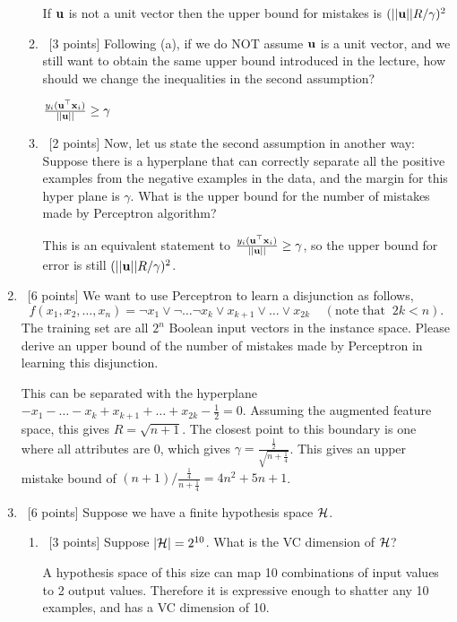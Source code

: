 \documentclass[12pt, fullpage,letterpaper]{article}
\begin{document}
\begin{enumerate}
\begin{enumerate}
		\bigskip
		If ${\bf u}$ is not a unit vector then the upper bound for mistakes is $(||{\bf u}||R/\gamma)^2$
		\bigskip
		\item~[3 points] Following (a), if we do NOT assume ${\bf u}$ is a unit vector, and we still want to obtain the same upper bound introduced in the lecture, how should we change the inequalities in the second assumption?
		
		\bigskip
		$\frac{y_i({\bf u}^\top {\bf x}_i)}{||{\bf u}||} \ge \gamma$
		\bigskip
		
		\item~[2 points]  Now, let us state the second assumption in another way: Suppose there is a hyperplane that can correctly separate all the positive examples from the negative examples in the data, and the margin for this hyper plane is $\gamma$. What is the upper bound for the number of mistakes made by Perceptron algorithm?
		
		\bigskip
		This is an equivalent statement to $\frac{y_i({\bf u}^\top {\bf x}_i)}{||{\bf u}||} \ge \gamma$, so the upper bound for error is still $(||{\bf u}||R/\gamma)^2$.
		
	\end{enumerate}
	
	\item~[6 points] We want to use Perceptron to learn a disjunction as follows,
	\[
	f(x_1, x_2, \ldots, x_n) = \neg x_1 \lor \neg \ldots \neg x_k \lor x_{k+1} \lor \ldots \lor x_{2k} \;\;\;\;(\mathrm{note\; that}\;\; 2k < n).
	\]
	The training set are all $2^n$ Boolean input vectors in the instance space. 
	Please derive an upper bound of the number of mistakes made by Perceptron in learning this disjunction.
	
	\bigskip
	This can be separated with the hyperplane $-x_1 - \ldots - x_k + x_{k+1} + \ldots + x_{2k} - \frac{1}{2} = 0$. Assuming the augmented feature space, this gives $R = \sqrt{n+1}$. The closest point to this boundary is one where all attributes are 0, which gives $\gamma = \frac{\frac{1}{2}}{\sqrt{n+\frac{1}{4}}}$. This gives an upper mistake bound of $(n + 1)/\frac{\frac{1}{4}}{n+\frac{1}{4}} = 4n^2 + 5n + 1$.

	\item~[6 points] Suppose we have a finite hypothesis space $\mathcal{H}$.
	\begin{enumerate}
		\item~[3 points] Suppose $|\mathcal{H}| = 2^{10}$. What is the VC dimension of $\mathcal{H}$? 
		
		\bigskip
		A hypothesis space of this size can map 10 combinations of input values to 2 output values. Therefore it is expressive enough to shatter any 10 examples, and has a VC dimension of 10.
		

\end{enumerate}
\end{enumerate}
\end{document}
